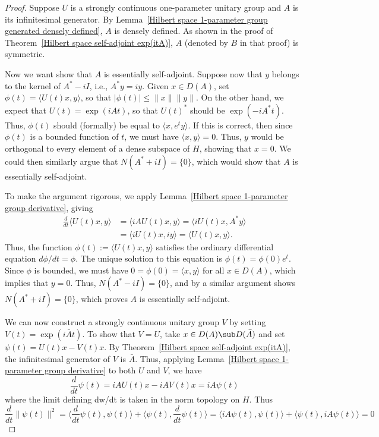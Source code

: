 \begin{proof}
Suppose $U$ is a strongly continuous one-parameter unitary group and $A$ is its infinitesimal generator. By Lemma~\ref{Hilbert space 1-parameter group generated densely defined}, $A$ is densely defined. As shown in the proof of Theorem~\ref{Hilbert space self-adjoint exp(itA)}, $A$ (denoted by $B$ in that proof) is symmetric.\par
Now we want show that $A$ is essentially self-adjoint. Suppose now that $y$ belongs to the kernel of $A^*-iI$, i.e., $A^*y=iy$. Given $x\in D(A)$, set $\phi(t)=\langle U(t)x,y\rangle$, so that $|\phi(t)|\leq\|x\|\|y\|$. On the other hand, we expect that $U(t)=\exp(iAt)$, so that $U(t)^*$ should be $\exp(-iA^*t)$. Thus, $\phi(t)$ should (formally) be equal to $\langle x,e^ty\rangle$. If this is correct, then since $\phi(t)$ is a bounded function of $t$, we must have $\langle x,y\rangle=0$. Thus, $y$ would be orthogonal to every element of a dense subspace of $H$, showing that $x=0$. We could then similarly argue that $N(A^*+iI)=\{0\}$, which would show that $A$ is essentially self-adjoint.\par
To make the argument rigorous, we apply Lemma~\ref{Hilbert space 1-parameter group derivative}, giving
\begin{align*}
\frac{d}{dt}\langle U(t)x,y\rangle&=\langle iAU(t)x,y\rangle=\langle iU(t)x,A^*y\rangle\\
&=\langle iU(t)x,iy\rangle=\langle U(t)x,y\rangle.
\end{align*}
Thus, the function $\phi(t):=\langle U(t)x,y\rangle$ satisfies the ordinary differential equation $d\phi/dt=\phi$. The unique solution to this equation is $\phi(t)=\phi(0)e^t$. Since $\phi$ is bounded, we must have $0=\phi(0)=\langle x,y\rangle$ for all $x\in D(A)$, which implies that $y=0$. Thus, $N(A^*-iI)=\{0\}$, and by a similar argument shows $N(A^*+iI)=\{0\}$, which proves $A$ is essentially self-adjoint.\par
We can now construct a strongly continuous unitary group $V$ by setting $V(t)=\exp(i\bar{A}t)$. To show that $V=U$, take $x\in D(A)\sub D(\bar{A})$ and set $\psi(t)=U(t)x-V(t)x$. By Theorem~\ref{Hilbert space self-adjoint exp(itA)}, the infinitesimal generator of $V$ is $\bar{A}$. Thus, applying Lemma~\ref{Hilbert space 1-parameter group derivative} to both $U$ and $V$, we have
\[\frac{d}{dt}\psi(t)=iAU(t)x-iAV(t)x=iA\psi(t)\]
where the limit defining dw/dt is taken in the norm topology on $H$. Thus
\[\frac{d}{dt}\|\psi(t)\|^2=\langle\frac{d}{dt}\psi(t),\psi(t)\rangle+\langle\psi(t),\frac{d}{dt}\psi(t)\rangle=\langle iA\psi(t),\psi(t)\rangle+\langle\psi(t),iA\psi(t)\rangle=0\]

\end{proof}
